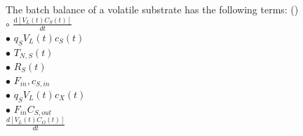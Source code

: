 \documentclass[]{beamer}
\begin{document}
\begin{frame}[shrink] {}
\addtocounter{questions}{1}
\color{blue}
The batch balance of a volatile substrate has the following terms: ()\\
\color{black}
\setlength{\parindent}{-0.4cm}
{\color{red}$\circ$} $\frac{\mathrm d [V_L (t) C_S (t)]}{dt}$ \\
{\color{red}$\bullet$} $q_S V_L (t) c_S (t)$ \\
{\color{red}$\bullet$} $T_{N,S} (t)$ \\
{\color{red}$\bullet$} $R_S (t)$ \\
{\color{red}$\bullet$} $F_{in}, c_{S,in}$ \\
{\color{red}$\bullet$} $q_S V_L(t) c_X(t)$  \\
{\color{red}$\bullet$} $F_{in} C_{S,out}$ \\

$\frac{d[V_L(t)C_O(t)]}{dt}$
\end{frame}
\end{document}
